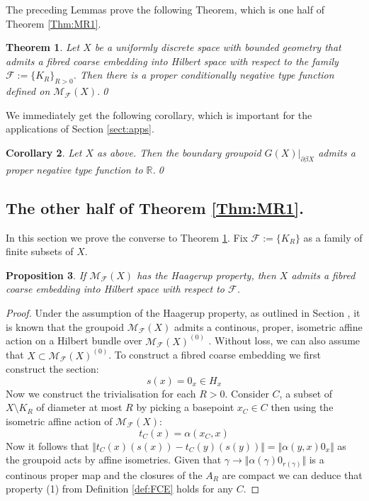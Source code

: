 \documentclass[11pt]{amsart}
\theoremstyle{plain}
\newtheorem{theorem}{Theorem}%
\newtheorem{proposition}[theorem]{Proposition}%
\newtheorem{corollary}[theorem]{Corollary}%
\theoremstyle{definition}%
\theoremstyle{remark}%
\begin{document}
{The preceding Lemmas prove the following Theorem, which is one half of Theorem \ref{Thm:MR1}.

\begin{theorem}\label{Thm:MT2}
Let $X$ be a uniformly discrete space with bounded geometry that admits a fibred coarse embedding into Hilbert space with respect to the family $\mathcal{F}:=\lbrace K_{R} \rbrace_{R>0}$. Then there is a proper conditionally negative type function defined on $\mathcal{M}_{\mathcal{F}}(X)$.\qed
\end{theorem}

We immediately get the following corollary, which is important for the applications of Section \ref{sect:apps}.

\begin{corollary}\label{thm:MT1-a}
Let $X$ as above. Then the boundary groupoid $G(X)|_{\partial\beta X}$ admits a proper negative type function to $\mathbb{R}$.\qed
\end{corollary}

\subsection{The other half of Theorem \ref{Thm:MR1}.}

In this section we prove the converse to Theorem \ref{Thm:MT2}. Fix $\mathcal{F}:=\lbrace K_{R} \rbrace$ as a family of finite subsets of $X$.

\begin{proposition}
If $\mathcal{M}_{\mathcal{F}}(X)$ has the Haagerup property, then $X$ admits a fibred coarse embedding into Hilbert space with respect to $\mathcal{F}$.
\end{proposition} 
\begin{proof}
Under the assumption of the Haagerup property, as outlined in Section , it is known that the groupoid $\mathcal{M}_{\mathcal{F}}(X)$ admits a continous, proper, isometric affine action on a Hilbert bundle over $\mathcal{M}_{\mathcal{F}}(X)^{(0)}$ \cite{MR1703305}. Without loss, we can also assume that $X \subset \mathcal{M}_{\mathcal{F}}(X)^{(0)}$. To construct a fibred coarse embedding we first construct the section:
\begin{equation*}
s(x) = 0_{x} \in H_{x}
\end{equation*}
Now we construct the trivialisation for each $R>0$. Consider $C$, a subset of $X\setminus K_{R}$ of diameter at most $R$ by picking a basepoint $x_{C} \in C$ then using the isometric affine action of $\mathcal{M}_{\mathcal{F}}(X)$:
\begin{equation*}
t_{C}(x)=\alpha(x_{C},x)
\end{equation*}
Now it follows that $\Vert t_{C}(x)(s(x)) - t_{C}(y)(s(y)) \Vert = \Vert \alpha(y,x)0_{x} \Vert$ as the groupoid acts by affine isometries. Given that $\gamma \rightarrow \Vert \alpha(\gamma)0_{r(\gamma)} \Vert$ is a continous proper map and the closures of the $A_{R}$ are compact we can deduce that property (1) from Definition \ref{def:FCE} holds for any $C$. 


\end{proof}}
\end{document}
